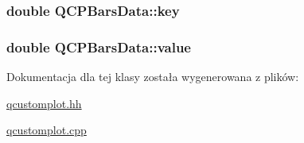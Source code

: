\subsubsection[{\texorpdfstring{key}{key}}]{\setlength{\rightskip}{0pt plus 5cm}double Q\+C\+P\+Bars\+Data\+::key}\hypertarget{class_q_c_p_bars_data_a09b492217dc03ee1c0348a2f2e6e0a04}{}\label{class_q_c_p_bars_data_a09b492217dc03ee1c0348a2f2e6e0a04}
\subsubsection[{\texorpdfstring{value}{value}}]{\setlength{\rightskip}{0pt plus 5cm}double Q\+C\+P\+Bars\+Data\+::value}\hypertarget{class_q_c_p_bars_data_ab636644fb40630f3b1b72f44d65ec072}{}\label{class_q_c_p_bars_data_ab636644fb40630f3b1b72f44d65ec072}


Dokumentacja dla tej klasy została wygenerowana z plików\+:\begin{DoxyCompactItemize}
\item 
\hyperlink{qcustomplot_8hh}{qcustomplot.\+hh}\item 
\hyperlink{qcustomplot_8cpp}{qcustomplot.\+cpp}\end{DoxyCompactItemize}
